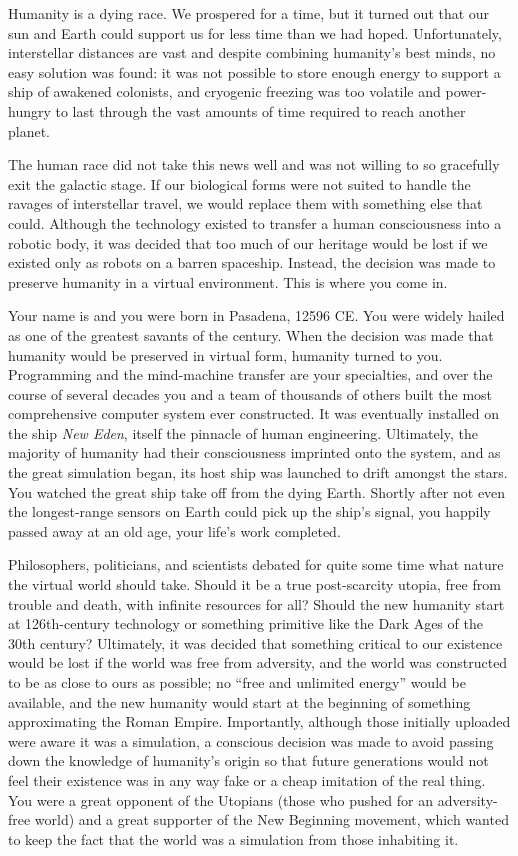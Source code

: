 \documentclass[char]{guildcamp1}
\begin{document}
\name{\cProgrammer{}}

Humanity is a dying race. We prospered for a time, but it turned out that our sun and Earth could support us for less time than we had hoped. Unfortunately, interstellar distances are vast and despite combining humanity's best minds, no easy solution was found: it was not possible to store enough energy to support a ship of awakened colonists, and cryogenic freezing was too volatile and power-hungry to last through the vast amounts of time required to reach another planet.

The human race did not take this news well and was not willing to so gracefully exit the galactic stage. If our biological forms were not suited to handle the ravages of interstellar travel, we would replace them with something else that could. Although the technology existed to transfer a human consciousness into a robotic body, it was decided that too much of our heritage would be lost if we existed only as robots on a barren spaceship. Instead, the decision was made to preserve humanity in a virtual environment. This is where you come in.

Your name is \cProgrammer{\they} and you were born in Pasadena, 12596 CE. You were widely hailed as one of the greatest savants of the century. When the decision was made that humanity would be preserved in virtual form, humanity turned to you. Programming and the mind-machine transfer are your specialties, and over the course of several decades you and a team of thousands of others built the most comprehensive computer system ever constructed. It was eventually installed on the ship \emph{New Eden}, itself the pinnacle of human engineering. Ultimately, the majority of humanity had their consciousness imprinted onto the system, and as the great simulation began, its host ship was launched to drift amongst the stars. You watched the great ship take off from the dying Earth. Shortly after not even the longest-range sensors on Earth could pick up the ship's signal, you happily passed away at an old age, your life's work completed.

Philosophers, politicians, and scientists debated for quite some time what nature the virtual world should take. Should it be a true post-scarcity utopia, free from trouble and death, with infinite resources for all? Should the new humanity start at 126th-century technology or something primitive like the Dark Ages of the 30th century? Ultimately,  it was decided that something critical to our existence would be lost if the world was free from adversity, and the world was constructed to be as close to ours as possible; no ``free and unlimited energy'' would be available, and the new humanity would start at the beginning of something approximating the Roman Empire. Importantly, although those initially uploaded were aware it was a simulation, a conscious decision was made to avoid passing down the knowledge of humanity's origin so that future generations would not feel their existence was in any way fake or a cheap imitation of the real thing. You were a great opponent of the Utopians (those who pushed for an adversity-free world) and a great supporter of the New Beginning movement, which wanted to keep the fact that the world was a simulation from those inhabiting it.
\end{document}
